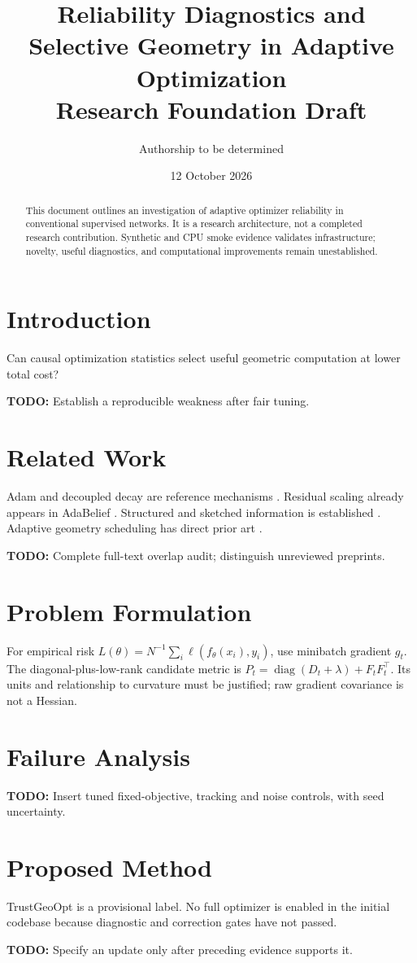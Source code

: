 \documentclass[11pt]{article}
\title{Reliability Diagnostics and Selective Geometry in Adaptive Optimization\\Research Foundation Draft}
\author{Authorship to be determined}
\date{12 October 2026}
\newcommand{\todo}[1]{\par\noindent\textbf{TODO:} #1\par}
\begin{document}
\maketitle
\begin{abstract}
This document outlines an investigation of adaptive optimizer reliability in
conventional supervised networks. It is a research architecture, not a completed
research contribution. Synthetic and CPU smoke evidence validates infrastructure;
novelty, useful diagnostics, and computational improvements remain unestablished.
\end{abstract}
\section{Introduction}
Can causal optimization statistics select useful geometric computation at lower
total cost? \todo{Establish a reproducible weakness after fair tuning.}
\section{Related Work}
Adam and decoupled decay are reference mechanisms \cite{adam2015,adamw2019}.
Residual scaling already appears in AdaBelief \cite{adabelief2020}.
Structured and sketched information is established \cite{kfac2015,shampoo2018,sketchy2023}.
Adaptive geometry scheduling has direct prior art \cite{purifying2025,foam2026}.
\todo{Complete full-text overlap audit; distinguish unreviewed preprints.}
\section{Problem Formulation}
For empirical risk $L(\theta)=N^{-1}\sum_i\ell(f_\theta(x_i),y_i)$, use minibatch
gradient $g_t$. The diagonal-plus-low-rank candidate metric is
$P_t=\operatorname{diag}(D_t+\lambda)+F_tF_t^\top$. Its units and relationship
to curvature must be justified; raw gradient covariance is not a Hessian.
\section{Failure Analysis}
\todo{Insert tuned fixed-objective, tracking and noise controls, with seed uncertainty.}
\section{Proposed Method}
TrustGeoOpt is a provisional label. No full optimizer is enabled in the initial
codebase because diagnostic and correction gates have not passed.
\todo{Specify an update only after preceding evidence supports it.}
\end{document}
